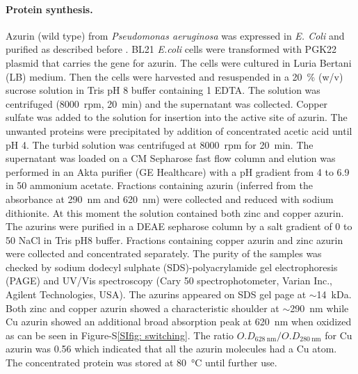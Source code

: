 \paragraph*{Protein synthesis.}
Azurin (wild type) from \textit{Pseudomonas aeruginosa} was expressed in \textit{E. Coli} and purified as described before \citep{kamp1990purification}.
BL21 \textit{E.coli} cells were transformed with PGK22 plasmid that carries the gene for azurin.
The cells were cultured in Luria Bertani (LB) medium.
Then the cells were harvested and resuspended in a \SI{20}{\percent} (w/v) sucrose solution in Tris pH 8 buffer containing \SI{1}{\mM} EDTA.
The solution was centrifuged (\SI{8000}{ rpm}, \SI{20}{\minute}) and the supernatant was collected.
Copper sulfate was added to the solution for insertion into the active site of azurin.
The unwanted proteins were precipitated by addition of concentrated acetic acid until pH 4. 
The turbid solution was centrifuged at \SI{8000}{ rpm} for \SI{20}{\minute}.
The supernatant was loaded on a CM Sepharose fast flow column and elution was performed in an Akta purifier (GE Healthcare) with a pH gradient from 4 to 6.9 in 
\SI{50}{\mM} ammonium acetate.
Fractions containing azurin (inferred from the absorbance at \SI{290}{\nm} and \SI{620}{\nm}) were collected and reduced with sodium dithionite.
At this moment the solution contained both zinc and copper azurin.
The azurins were purified in a DEAE sepharose column by a salt gradient of 0 to \SI{50}{\mM} NaCl in Tris pH8 buffer. 
Fractions containing copper azurin and zinc azurin were collected and concentrated separately.
The purity of the samples was checked by sodium dodecyl sulphate (SDS)-polyacrylamide gel electrophoresis (PAGE) and UV/Vis spectroscopy (Cary 50 spectrophotometer, Varian Inc., Agilent Technologies, USA).
The azurins appeared on SDS gel page at $\sim$\SI{14}{ kDa}.
Both zinc and copper azurin showed a characteristic shoulder at ${\sim}$\SI{290}{\nm} while Cu azurin showed an additional 
broad absorption peak at \SI{620}{\nm} when oxidized as can be seen in Figure-S\ref{SIfig: switching}. 
The ratio $O.D_{\SI{628}{\nm}}/O.D_{\SI{280}{\nm}}$ for Cu azurin was 0.56 which indicated that all the azurin molecules had a Cu atom. 
The concentrated protein was stored at \SI{80}{\celsius} until further use.

